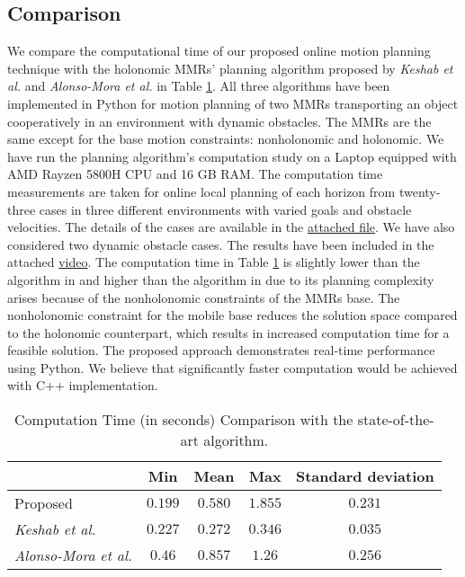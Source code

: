 \subsection{Comparison} \label{ComparativeAnalysis}
We compare the computational time of our proposed online motion planning technique with the holonomic MMRs' planning algorithm proposed by \textit{Keshab et al.} \cite{2024b_Keshab} and  \textit{Alonso-Mora et al.} \cite{2017_AlonsoMora} in Table \ref{tab:ComputationTime}. All three algorithms have been implemented in Python for motion planning of two MMRs transporting an object cooperatively in an environment with dynamic obstacles. The MMRs are the same except for the base motion constraints: nonholonomic and holonomic. We have run the planning algorithm's computation study on a Laptop equipped with AMD Rayzen 5800H CPU and 16 GB RAM. The computation time measurements are taken for online local planning of each horizon from twenty-three cases in three different environments with varied goals and obstacle velocities. The details of the cases are available in the \href{https://drive.google.com/file/d/11kg1cFx5Pdsc1OzTVFD5Ny8kpwd0mBUL/view?usp=drive_link}{attached file}. We have also considered two dynamic obstacle cases. The results have been included in the attached \href{https://youtu.be/Hw2sWUVxgYU}{video}. The computation time in Table \ref{tab:ComputationTime} is slightly lower than the algorithm in \cite{2017_AlonsoMora} and higher than the algorithm in \cite{2024b_Keshab} due to its planning complexity arises because of the nonholonomic constraints of the MMRs base. The nonholonomic constraint for the mobile base reduces the solution space compared to the holonomic counterpart, which results in increased computation time for a feasible solution. The proposed approach demonstrates real-time performance using Python. We believe that significantly faster computation would be achieved with C++ implementation. 

\begin{table}[h]
	\centering
	\caption{Computation Time (in seconds) Comparison with the state-of-the-art algorithm.}
	\begin{tabular}{@{}lcccc@{}}
		\hline
		  & Min& Mean & Max & Standard deviation\\
		\hline
		Proposed&$0.199$&$0.580$ & $1.855$& $0.231$ \\
		\hline
        \textit{Keshab et al.}\cite{2024b_Keshab} &$0.227$&$0.272$ & $0.346$& $0.035$ \\
        \hline
		\textit{Alonso-Mora et al.}\cite{2017_AlonsoMora}&$0.46$&$0.857$ & $1.26$& $0.256$ \\
        \hline
	\end{tabular}
	\label{tab:ComputationTime}
\end{table}
